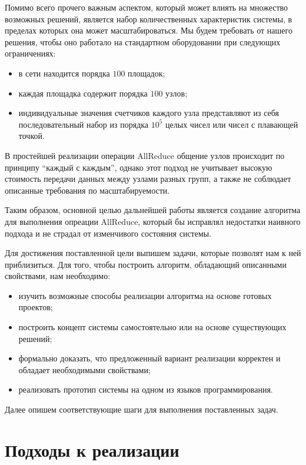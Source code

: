 \documentclass{article}
\theoremstyle{plain}
\theoremstyle{plain}
\theoremstyle{plain}
\theoremstyle{plain}
\theoremstyle{definition}
\theoremstyle{remark}
\theoremstyle{plain}
\begin{document}
Помимо всего прочего важным аспектом, который может влиять на множество возможных решений, является набор количественных характеристик системы, в пределах которых она может масштабироваться. Мы будем требовать от нашего решения, чтобы оно работало на стандартном оборудовании при следующих ограничениях:

\begin{itemize}
    \item в сети находится порядка $100$ площадок;
    \item каждая площадка содержит порядка $100$ узлов;
    \item индивидуальные значения счетчиков каждого узла представляют из себя последовательный набор из порядка $10^5$ целых чисел или чисел с плавающей точкой.
\end{itemize}

В простейшей реализации операции AllReduce общение узлов происходит по принципу \enquote{каждый с каждым}, однако этот подход не учитывает высокую стоимость передачи данных между узлами разных групп, а также не соблюдает описанные требования по масштабируемости.

Таким образом, основной целью дальнейшей работы является создание алгоритма для выполнения опреации AllReduce, который бы исправлял недостатки наивного подхода и не страдал от изменчивого состояния системы.

Для достижения поставленной цели выпишем задачи, которые позволят нам к ней приблизиться. Для того, чтобы построить алгоритм, обладающий описанными свойствами, нам необходимо:

\begin{itemize}
    \item изучить возможные способы реализации алгоритма на основе готовых проектов;
    \item построить концепт системы самостоятельно или на основе существующих решений;
    \item формально доказать, что предложенный вариант реализации корректен и обладает необходимыми свойствами;
    \item реализовать прототип системы на одном из языков программирования.
\end{itemize}

Далее опишем соответствующие шаги для выполнения поставленных задач.

\section{Подходы к реализации}
\end{document}
